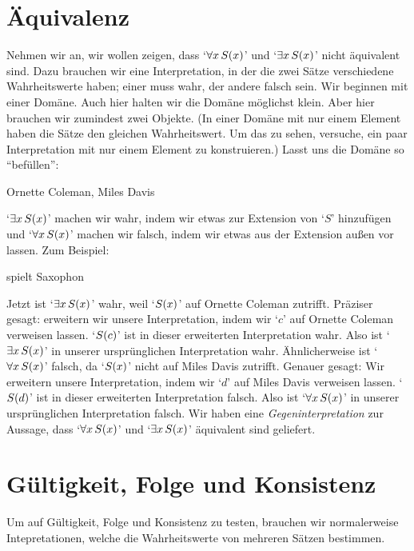 \section{Äquivalenz}
Nehmen wir an, wir wollen zeigen, dass `$\forall x\, \mathord{S}(x)$' und `$\exists x\, \mathord{S}(x)$' nicht äquivalent sind. Dazu brauchen wir eine Interpretation, in der die zwei Sätze verschiedene Wahrheitswerte haben; einer muss wahr, der andere falsch sein. Wir beginnen mit einer Domäne. Auch hier halten wir die Domäne möglichst klein. Aber hier brauchen wir zumindest zwei Objekte. (In einer Domäne mit nur einem Element haben die Sätze den gleichen Wahrheitswert. Um das zu sehen, versuche, ein paar Interpretation mit nur einem Element zu konstruieren.) Lasst uns die Domäne so ``befüllen'':
	\begin{ekey}
		\item[\text{Domäne}] Ornette Coleman, Miles Davis
	\end{ekey}
`$\exists x\, \mathord{S}(x)$' machen wir wahr, indem wir etwas zur Extension von `$S$' hinzufügen und `$\forall x\, \mathord{S}(x)$' machen wir falsch, indem wir etwas aus der Extension au{\ss}en vor lassen. Zum Beispiel:
	\begin{ekey}
		\item[\atom{S}{x}]  spielt Saxophon
	\end{ekey}
Jetzt ist `$\exists x\, \mathord{S}(x)$' wahr, weil `$\mathord{S}(x)$' auf Ornette Coleman zutrifft. Präziser gesagt: erweitern wir unsere Interpretation, indem wir `$c$' auf Ornette Coleman verweisen lassen. `$\mathord{S}(c)$' ist in dieser erweiterten Interpretation wahr. Also ist `$\exists x\, \mathord{S}(x)$' in unserer ursprünglichen Interpretation wahr. Ähnlicherweise ist `$\forall x\, \mathord{S}(x)$' falsch, da `$\mathord{S}(x)$' nicht auf Miles Davis zutrifft. Genauer gesagt: Wir erweitern unsere Interpretation, indem wir `$d$' auf Miles Davis verweisen lassen. `$\mathord{S}(d)$' ist in dieser erweiterten Interpretation falsch. Also ist `$\forall x\, \mathord{S}(x)$' in unserer ursprünglichen Interpretation falsch. Wir haben eine \emph{Gegeninterpretation} zur Aussage, dass `$\forall x\, \mathord{S}(x)$' und `$\exists x\, \mathord{S}(x)$' äquivalent sind geliefert.

\section{Gültigkeit, Folge und Konsistenz}
Um auf Gültigkeit, Folge und Konsistenz zu testen, brauchen wir normalerweise Intepretationen, welche die Wahrheitswerte von mehreren Sätzen bestimmen. 

